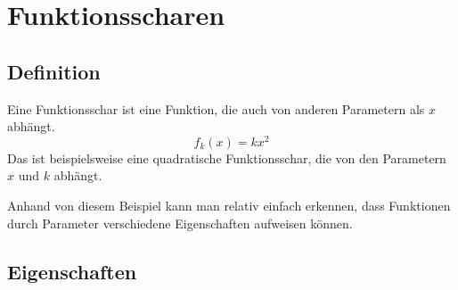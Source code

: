 \chapter{Funktionsscharen}

\section{Definition}
\begin{flushleft}
  Eine Funktionsschar ist eine Funktion, die auch von anderen Parametern als \(x\) abhängt.
  \newline
  \[
    f_k(x)=kx^2
  \]
  \newline
  Das ist beispielsweise eine quadratische Funktionsschar, die von den Parametern \(x\) und \(k\) abhängt.
\end{flushleft}

\begin{center}
\end{center}

\begin{flushleft}
  Anhand von diesem Beispiel kann man relativ einfach erkennen, dass Funktionen durch Parameter verschiedene Eigenschaften aufweisen können.
\end{flushleft}

\section{Eigenschaften}

